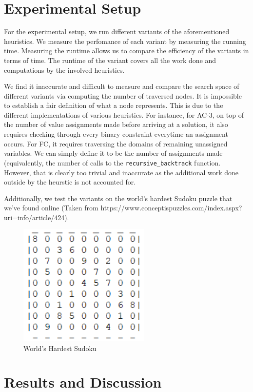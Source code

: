\documentclass[9.5pt]{extarticle}
\begin{document}
\section{Experimental Setup}

For the experimental setup, we run different variants of the aforementioned heuristics. We measure the perfomance of each variant by measuring the running time. Measuring the runtime allows us to compare the efficiency of the variants in terms of time. The runtime of the variant covers all the work done and computations by the involved heuristics.

We find it inaccurate and difficult to measure and compare the search space of different variants via computing the number of traversed nodes. It is impossible to establish a fair definition of what a node represents. This is due to the different implementations of various heuristics. For instance, for AC-3, on top of the number of value assignments made before arriving at a solution, it also requires checking through every binary constraint everytime an assignment occurs. For FC,  it requires traversing the domains of remaining unassigned variables. We can simply define it to be the number of assignments made (equivalently, the number of calls to the \verb`recursive_backtrack` function. However, that is clearly too trivial and inaccurate as the additional work done outside by the heurstic is not accounted for. 

Additionally, we test the variants on the world's hardest Sudoku puzzle that we've found online (Taken from https://www.conceptispuzzles.com/index.aspx?uri=info/article/424).

\begin{figure}[H]
\centering
\includegraphics[scale=0.9]{hardest_sudoku.png}
\caption{World's Hardest Sudoku}
\label{Figure 1}
\end{figure}

\section{Results and Discussion}
\end{document}
